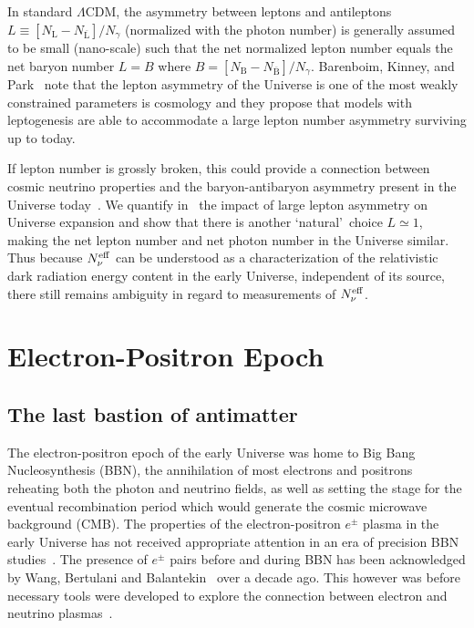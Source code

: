 \documentclass[universe,article,submit,moreauthors,pdftex,a4paper]{Definitions/mdpi}
\newcommand*{\xblue}{\color{black}}
\begin{document}
In standard $\Lambda$CDM, the asymmetry between leptons and antileptons $L\equiv [N_\mathrm{L}-N_{\overline{\mathrm{L}}}] /N_\gamma $ (normalized with the photon number) is generally assumed to be small (nano-scale) such that the net normalized lepton number equals the net baryon number $L=B$ where $B=[N_\mathrm{B}-N_{\overline{\mathrm{B}}}]/N_\gamma $. Barenboim, Kinney, and Park~\cite{Barenboim:2016shh,Barenboim:2017dfq} note that the lepton asymmetry of the Universe is one of the most weakly constrained parameters is cosmology and they propose that models with leptogenesis are able to accommodate a large lepton number asymmetry surviving up to today. 

{\xblue If lepton number is grossly broken, this could provide a connection between cosmic neutrino properties and the baryon-antibaryon asymmetry present in the Universe today~\cite{Barenboim:2017dfq}.} We quantify in~\cite{Yang:2018oqg} the impact of large lepton asymmetry on Universe expansion and show that there is another \lq natural\rq\ choice $L\simeq 1$, making the net lepton number and net photon number in the Universe similar. Thus because $N_{\nu}^{{\rm eff}}$ can be understood as a characterization of the relativistic dark radiation energy content in the early Universe, independent of its source, there still remains ambiguity in regard to measurements of $N_{\nu}^{\rm eff}$.

\section{Electron-Positron Epoch}\label{sec:ElectronPositron}
\subsection{The last bastion of antimatter}\label{sec:ElectronPositronDensity}
\noindent The electron-positron epoch of the early Universe was home to Big Bang Nucleosynthesis (BBN), the annihilation of most electrons and positrons reheating both the photon and neutrino fields, as well as setting the stage for the eventual recombination period which would generate the cosmic microwave background (CMB). The properties of the electron-positron $e^{\pm}$ plasma in the early Universe has not received appropriate attention in an era of precision BBN studies~\cite{Pitrou:2018cgg}. The presence of $e^{\pm}$ pairs before and during BBN has been acknowledged by Wang, Bertulani and Balantekin~\cite{Wang:2010px,Hwang:2021kno} over a decade ago. This however was before necessary tools were developed to explore the connection between electron and neutrino plasmas~\cite{Mangano:2005cc,Birrell:2012gg,Birrell:2014uka}.
\end{document}
